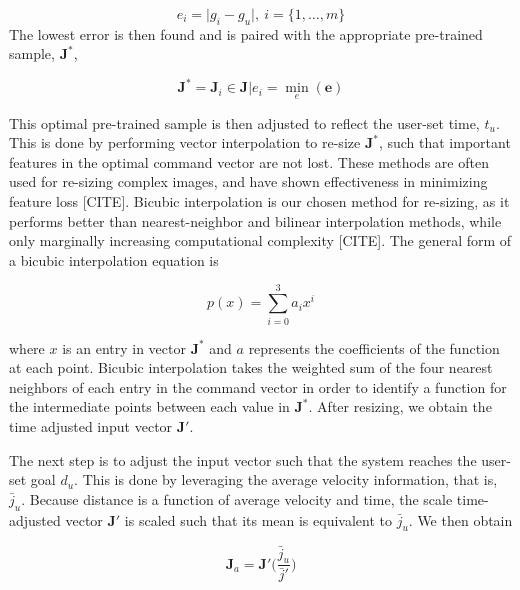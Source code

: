 \documentclass[letterpaper, 10 pt, conference]{ieeeconf}  %
\begin{document}
\begin{equation}
 e_i = \vert g_i-g_u \vert , ~i= \{1,\ldots,m\}
\end{equation}
 The lowest error is then found and is paired with the appropriate pre-trained sample, $\mathbf{J}^*$,

\begin{equation}
\mathbf{J}^* = \mathbf{J}_i \in \mathbf{J}\vert e_i = \min_e(\mathbf{e})
\end{equation}

This optimal pre-trained sample is then adjusted to reflect the user-set time, $t_u$. This is done by performing vector interpolation to re-size $\mathbf{J}^*$, such that important features in the optimal command vector are not lost. These methods are often used for re-sizing complex images, and have shown effectiveness in minimizing feature loss [CITE]. Bicubic interpolation is our chosen method for re-sizing, as it performs better than nearest-neighbor and bilinear interpolation methods, while only marginally increasing computational complexity [CITE]. The general form of a bicubic interpolation equation is 

\begin{equation} \label{eq:bicinter}
    p(x) = \sum_{i=0}^3a_ix^i
\end{equation}

where $x$ is an entry in vector $\mathbf{J}^*$ and $a$ represents the coefficients of the function at each point. Bicubic interpolation takes the weighted sum of the four nearest neighbors of each entry in the command vector in order to identify a function for the intermediate points between each value in $\mathbf{J}^*$. After resizing, we obtain the time adjusted input vector $\mathbf{J}'$.

The next step is to adjust the input vector such that the system reaches the user-set goal $d_u$. This is done by leveraging the average velocity information, that is, $\bar{j}_u$. Because distance is a function of average velocity and time, the scale time-adjusted vector $\mathbf{J}'$ is scaled such that its mean is equivalent to $\bar{j}_u$. We then obtain

\begin{equation} \label{eq:imgscale}
\mathbf{J}_a = \mathbf{J}'\bigg(\frac{\bar{j}_u}{\bar{j}'}\bigg)
\end{equation}
\end{document}
